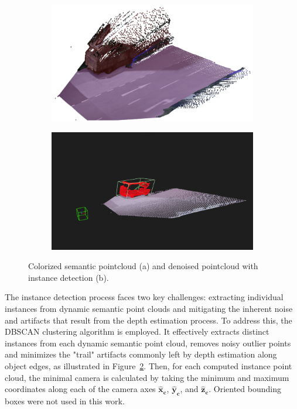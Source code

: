 \begin{figure}[h!]
    \centering
    \begin{subfigure}[b]{0.45\textwidth}
        \includegraphics[width=\linewidth]{images/methodology/pcd_semantic.png}
        \caption{}
        \label{fig:semantic_pointcloud_a}
    \end{subfigure}
    \hfill
    \begin{subfigure}[b]{0.45\textwidth}
        \includegraphics[width=\textwidth]{images/methodology/pcd_semantic_filtered.png}
        \caption{}
        \label{fig:semantic_pointcloud_b}
    \end{subfigure}

    \caption{Colorized semantic pointcloud (a) and denoised pointcloud with instance detection (b).}
    \label{fig:semantic_pointcloud}
\end{figure}

The instance detection process faces two key challenges: extracting individual instances from dynamic semantic point clouds and mitigating the inherent noise and artifacts that result from the depth estimation process. To address this, the DBSCAN clustering algorithm is employed. It effectively extracts distinct instances from each dynamic semantic point cloud, removes noisy outlier points and minimizes the "trail" artifacts commonly left by depth estimation along object edges, as illustrated in Figure~\ref{fig:semantic_pointcloud_b}. Then, for each computed instance point cloud, the minimal camera  is calculated by taking the minimum and maximum coordinates along each of the camera axes $\mathbf{\hat{x}_c}$, $\mathbf{\hat{y}_c}$, and $\mathbf{\hat{z}_c}$. Oriented bounding boxes were not used in this work.

